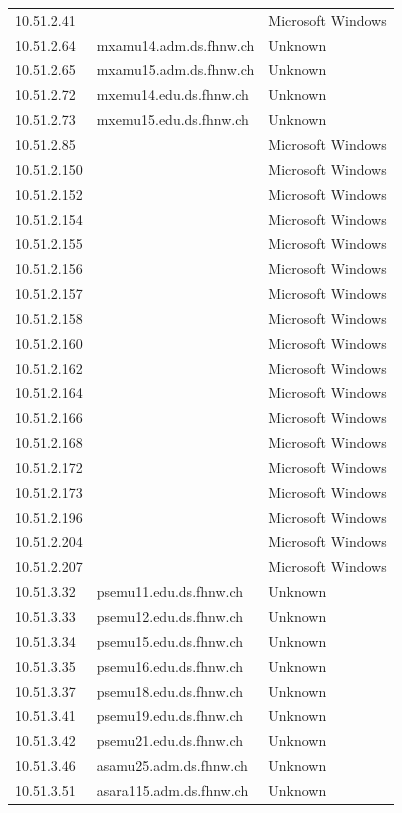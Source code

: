 \documentclass[11pt,a4paper]{scrartcl}
\begin{document}
\begin{longtable}{p{2.5cm}|p{8cm}|l}
	10.51.2.41 &  & Microsoft Windows\\
	10.51.2.64 & mxamu14.adm.ds.fhnw.ch & Unknown\\
	10.51.2.65 & mxamu15.adm.ds.fhnw.ch & Unknown\\
	10.51.2.72 & mxemu14.edu.ds.fhnw.ch & Unknown\\
	10.51.2.73 & mxemu15.edu.ds.fhnw.ch & Unknown\\
	10.51.2.85 &  & Microsoft Windows\\
	10.51.2.150 &  & Microsoft Windows\\
	10.51.2.152 &  & Microsoft Windows\\
	10.51.2.154 &  & Microsoft Windows\\
	10.51.2.155 &  & Microsoft Windows\\
	10.51.2.156 &  & Microsoft Windows\\
	10.51.2.157 &  & Microsoft Windows\\
	10.51.2.158 &  & Microsoft Windows\\
	10.51.2.160 &  & Microsoft Windows\\
	10.51.2.162 &  & Microsoft Windows\\
	10.51.2.164 &  & Microsoft Windows\\
	10.51.2.166 &  & Microsoft Windows\\
	10.51.2.168 &  & Microsoft Windows\\
	10.51.2.172 &  & Microsoft Windows\\
	10.51.2.173 &  & Microsoft Windows\\
	10.51.2.196 &  & Microsoft Windows\\
	10.51.2.204 &  & Microsoft Windows\\
	10.51.2.207 &  & Microsoft Windows\\
	10.51.3.32 & psemu11.edu.ds.fhnw.ch & Unknown\\
	10.51.3.33 & psemu12.edu.ds.fhnw.ch & Unknown\\
	10.51.3.34 & psemu15.edu.ds.fhnw.ch & Unknown\\
	10.51.3.35 & psemu16.edu.ds.fhnw.ch & Unknown\\
	10.51.3.37 & psemu18.edu.ds.fhnw.ch & Unknown\\
	10.51.3.41 & psemu19.edu.ds.fhnw.ch & Unknown\\
	10.51.3.42 & psemu21.edu.ds.fhnw.ch & Unknown\\
	10.51.3.46 & asamu25.adm.ds.fhnw.ch & Unknown\\
	10.51.3.51 & asara115.adm.ds.fhnw.ch & Unknown\\

\end{longtable}
\end{document}
